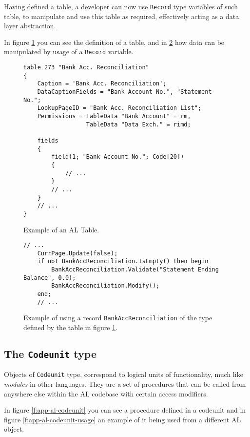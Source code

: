 Having defined a table, a developer can now use \texttt{Record} type variables of such table,
to manipulate and use this table as required, effectively acting as a data layer abstraction.

In figure \ref{f:app-al-table-alcode} you can see the definition of a table, and in \ref{f:app-al-record-usage}
how data can be manipulated by usage of a \texttt{Record} variable.

\begin{figure}
    \begin{Verbatim}[fontsize=\small]
table 273 "Bank Acc. Reconciliation"
{
    Caption = 'Bank Acc. Reconciliation';
    DataCaptionFields = "Bank Account No.", "Statement No.";
    LookupPageID = "Bank Acc. Reconciliation List";
    Permissions = TableData "Bank Account" = rm,
                  TableData "Data Exch." = rimd;

    fields
    {
        field(1; "Bank Account No."; Code[20])
        {
            // ...
        }
        // ...
    }
    // ...
}
    \end{Verbatim}
    \caption{Example of an AL Table.}
    \label{f:app-al-table-alcode}
\end{figure}

\begin{figure}
    \begin{Verbatim}[fontsize=\small]
    // ...
    CurrPage.Update(false);
    if not BankAccReconciliation.IsEmpty() then begin
        BankAccReconciliation.Validate("Statement Ending Balance", 0.0);
        BankAccReconciliation.Modify();
    end;
    // ...
    \end{Verbatim}
    \caption{Example of using a record \texttt{BankAccReconciliation} of the type defined by the table in figure \ref{f:app-al-table-alcode}.}
    \label{f:app-al-record-usage}
\end{figure}

\subsection{The \texttt{Codeunit} type}

Objects of \texttt{Codeunit} type, correspond to logical units of functionality, much like \emph{modules} in 
other languages. They are a set of procedures that can be called from anywhere else within the AL codebase
with certain access modifiers.

In figure \ref{f:app-al-codeunit} you can see a procedure defined in a codeunit and in figure \ref{f:app-al-codeunit-usage}
an example of it being used from a different AL object.

